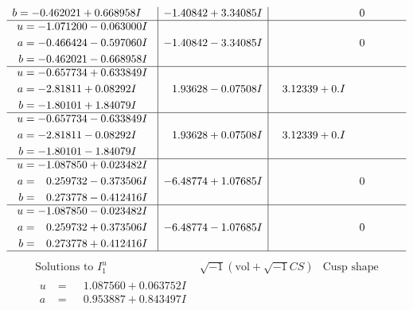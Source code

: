 \documentclass[1p]{elsarticle_modified}
\theoremstyle{definition}
\newcommand{\I}{\sqrt{-1}}
\begin{document}
$$\begin{array}{c|c|c}
\begin{aligned}
b &= -0.462021 + 0.668958 I\end{aligned}
 & -1.40842 + 3.34085 I & \phantom{-0.000000 } 0 \\ \hline\begin{aligned}
u &= -1.071200 - 0.063000 I \\
a &= -0.466424 - 0.597060 I \\
b &= -0.462021 - 0.668958 I\end{aligned}
 & -1.40842 - 3.34085 I & \phantom{-0.000000 } 0 \\ \hline\begin{aligned}
u &= -0.657734 + 0.633849 I \\
a &= -2.81811 + 0.08292 I \\
b &= -1.80101 + 1.84079 I\end{aligned}
 & \phantom{-}1.93628 - 0.07508 I & \phantom{-}3.12339 + 0. I\phantom{ +0.000000I} \\ \hline\begin{aligned}
u &= -0.657734 - 0.633849 I \\
a &= -2.81811 - 0.08292 I \\
b &= -1.80101 - 1.84079 I\end{aligned}
 & \phantom{-}1.93628 + 0.07508 I & \phantom{-}3.12339 + 0. I\phantom{ +0.000000I} \\ \hline\begin{aligned}
u &= -1.087850 + 0.023482 I \\
a &= \phantom{-}0.259732 - 0.373506 I \\
b &= \phantom{-}0.273778 - 0.412416 I\end{aligned}
 & -6.48774 + 1.07685 I & \phantom{-0.000000 } 0 \\ \hline\begin{aligned}
u &= -1.087850 - 0.023482 I \\
a &= \phantom{-}0.259732 + 0.373506 I \\
b &= \phantom{-}0.273778 + 0.412416 I\end{aligned}
 & -6.48774 - 1.07685 I & \phantom{-0.000000 } 0\\
 \hline 
 \end{array}$$\newpage$$\begin{array}{c|c|c}  
\text{Solutions to }I^u_{1}& \I (\text{vol} + \sqrt{-1}CS) & \text{Cusp shape}\\
 \hline 
\begin{aligned}
u &= \phantom{-}1.087560 + 0.063752 I \\
a &= \phantom{-}0.953887 + 0.843497 I \\

\end{aligned}
\end{array}$$
\end{document}
